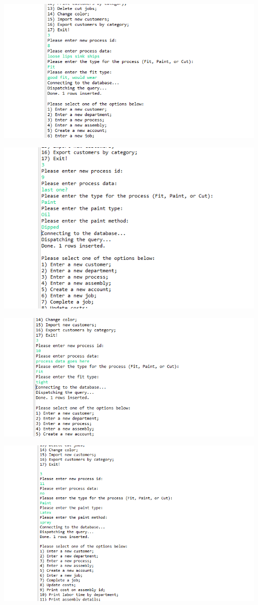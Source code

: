 \documentclass[11pt]{article}
\begin{document}
\includegraphics[width = \textwidth]{process4.png}

\includegraphics[width = \textwidth]{process5.png}


\includegraphics[width = \textwidth]{insertProcess4.png}

\includegraphics[width = \textwidth]{insertProcess5.png}
\end{document}
